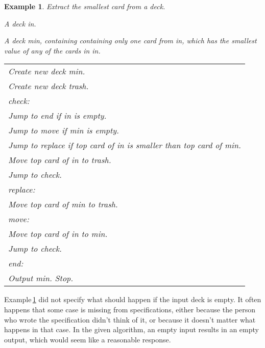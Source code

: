 \documentclass[a4paper,twoside]{tufte-handout}
\newtheorem{example}{Example}
\newcommand\lbl[1]{\hspace{-1em}\emph{#1:}}
\begin{document}
\begin{example}\label{extractsmallest}
  Extract the smallest card from a deck.
  \begin{description}
  \item[Input:] A deck \emph{in}.
  \item[Output:] A deck \emph{min}, containing containing only one
    card from \emph{in}, which has the smallest value of any of the
    cards in \emph{in}.
 \item[Algorithm:]
  \item\normalfont
    \begin{tabular}{l}
      Create new deck \emph{min}.\\
      Create new deck \emph{trash}.\\
      \lbl{check}\\
      Jump to \emph{end} if \emph{in} is empty.\\
      Jump to \emph{move} if \emph{min} is empty.\\
      Jump to \emph{replace} if top card of \emph{in} is smaller than
      top card of \emph{min}.\\
      Move top card of \emph{in} to \emph{trash}.\\
      Jump to \emph{check}.\\
      \lbl{replace}\\
      Move top card of \emph{min} to \emph{trash}.\\
      \lbl{move}\\
      Move top card of \emph{in} to \emph{min}.\\
      Jump to \emph{check}.\\
      \lbl{end}\\
      Output \emph{min}.
      Stop.
    \end{tabular}
  \end{description}
\end{example}

Example\,\ref{extractsmallest} did not specify what should happen if
the input deck is empty. It often happens that some case is missing
from specifications, either because the person who wrote the
specification didn't think of it, or because it doesn't matter what
happens in that case. In the given algorithm, an empty input results
in an empty output, which would seem like a reasonable response.
\end{document}
